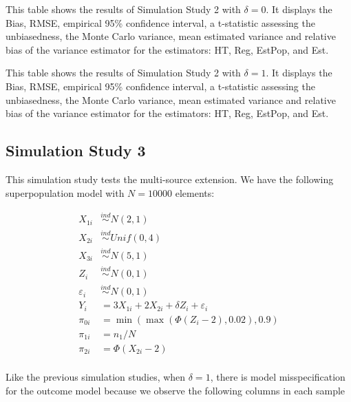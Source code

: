 \documentclass[12pt]{article}
\begin{document}
\begin{table}[ht!]
  \centering
  
\caption{This table shows the results of Simulation Study 2 with $\delta = 0$.
  It displays the Bias, RMSE, empirical 95\% confidence interval, a t-statistic
  assessing the unbiasedness, the Monte Carlo variance, mean estimated variance
  and relative bias of the variance estimator for the estimators: HT, Reg,
  EstPop, and Est.}
\label{tab:nndc0-mean}
\end{table}

\begin{table}[ht!]
  \centering
  
\caption{This table shows the results of Simulation Study 2 with $\delta = 1$.
  It displays the Bias, RMSE, empirical 95\% confidence interval, a t-statistic
  assessing the unbiasedness, the Monte Carlo variance, mean estimated variance
  and relative bias of the variance estimator for the estimators: HT, Reg,
  EstPop, and Est.}
\label{tab:nndc1-mean}
\end{table}

\subsection{Simulation Study 3}

This simulation study tests the multi-source extension.
We have the following superpopulation model with $N = 10000$ elements:

$$
\begin{aligned}
X_{1i} &\stackrel{ind}{\sim} N(2, 1) \\
X_{2i} &\stackrel{ind}{\sim} Unif(0, 4) \\
X_{3i} &\stackrel{ind}{\sim} N(5, 1) \\
Z_i &\stackrel{ind}{\sim} N(0, 1) \\
\varepsilon_i &\stackrel{ind}{\sim} N(0, 1) \\
Y_{i} &= 3 X_{1i} + 2 X_{2i} + \delta Z_{i} + \varepsilon_i \\
\pi_{0i} &= \min(\max(\Phi(Z_i - 2), 0.02), 0.9)\\
\pi_{1i} &= n_1 / N\\
\pi_{2i} &= \Phi(X_{2i} - 2) \\
\end{aligned}
$$

Like the previous simulation studies, when $\delta = 1$, there is model
misspecification for the outcome model because we observe the following columns
in each sample
\end{document}
